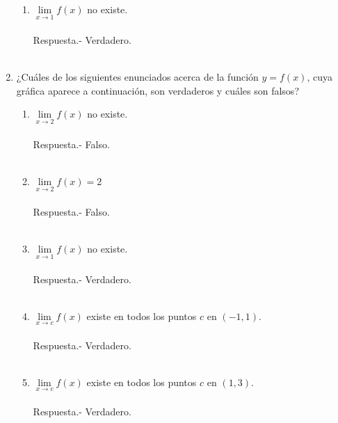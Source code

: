 \begin{enumerate}
\begin{enumerate}[\bfseries a)]
    \item $\lim\limits_{x\to 1}f(x)$ no existe.\\\\
	Respuesta.-\; Verdadero.\\\\

\end{enumerate}

\item ¿Cuáles de los siguientes enunciados acerca de la función $y = f(x)$, cuya gráfica aparece a continuación, son verdaderos y cuáles son falsos?
\begin{enumerate}[\bfseries a)]

    \item $\lim\limits_{x\to 2}f(x)$ no existe.\\\\
	Respuesta.-\; Falso.\\\\

    \item $\lim\limits_{x\to 2}f(x) = 2$\\\\
	Respuesta.-\; Falso.\\\\

    \item $\lim\limits_{x\to 1}f(x)$ no existe.\\\\
	Respuesta.-\; Verdadero.\\\\

    \item $\lim\limits_{x\to c}f(x)$ existe en todos los puntos $c$ en $(-1,1).$\\\\
	Respuesta.-\; Verdadero.\\\\

    \item $\lim\limits_{x\to c}f(x)$ existe en todos los puntos $c$ en $(1,3).$\\\\
	Respuesta.-\; Verdadero.\\\\

\end{enumerate}


\end{enumerate}
